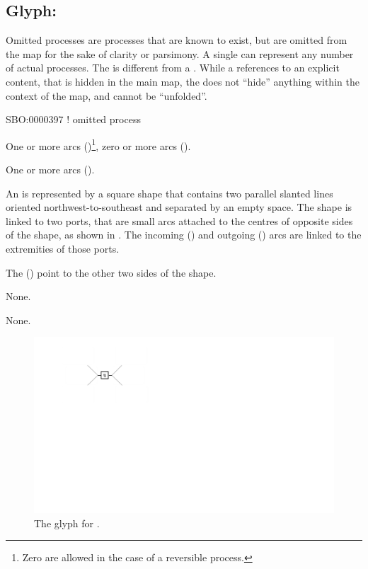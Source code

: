 \subsection{Glyph: }
\label{sec:omitted}

Omitted processes are processes that are known to exist, but are omitted from the map for the sake of clarity or parsimony. A single  can represent any number of actual processes. The  is different from a . While a  references to an explicit content, that is hidden in the main map, the  does not ``hide'' anything within the context of the map, and cannot be ``unfolded''.

\begin{glyphDescription}

\glyphSboTerm
SBO:0000397 ! omitted process


\glyphIncoming
One or more  arcs ()\footnote{Zero  are allowed in the case of a reversible process.}, zero or more  arcs ().



\glyphOutgoing
One or more  arcs ().


\glyphContainer
An  is represented by a square shape that contains two parallel slanted lines oriented northwest-to-southeast and separated by an empty space.
The shape is linked to two ports, that are small arcs attached to the centres of opposite sides of the shape, as shown in .
The incoming  () and outgoing  () arcs are linked to the extremities of those ports.

The  () point to the other two sides of the shape.

\glyphLabel
None.

\glyphAux
None.

\end{glyphDescription}

\begin{figure}[H]
  \centering
  \includegraphics{images/omitted}
  \caption{The \PD glyph for .}
  \label{fig:omitted}
\end{figure}
